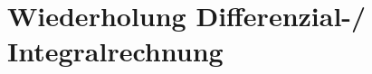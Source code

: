 \documentclass[
	11pt, %
]{beamer}
\begin{document}
%
\section{Wiederholung Differenzial-/ Integralrechnung}
\end{document}
